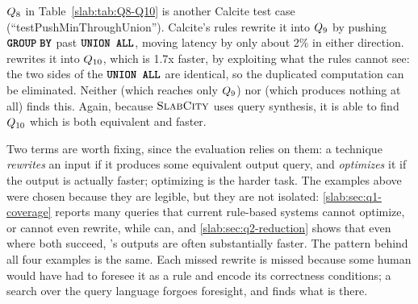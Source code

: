 $Q_8$ in Table~\ref{slab:tab:Q8-Q10} is another Calcite test
case (``testPushMinThroughUnion''). Calcite's rules rewrite it into
$Q_9$ by pushing ${\color{black}{{\textbf{\texttt{GROUP}}\;\textbf{\texttt{BY}}}}}$ past $\sqlunionallcolor$,
moving latency by only about 2\% in either direction. \slabcity
rewrites it into $Q_{10}$, which is 1.7x faster, by exploiting
what the rules cannot see: the two sides of the $\sqlunionallcolor$
are identical, so the duplicated computation can be eliminated.
Neither \learnedrewrite (which reaches only $Q_9$) nor \wetune
(which produces nothing at all) finds this.
Again, because $\textsc{SlabCity}$ uses query synthesis, it is able to find $Q_{10}$ which is both equivalent and faster.


Two terms are worth fixing, since the evaluation relies on them: a
technique \emph{rewrites} an input if it produces some equivalent
output query, and \emph{optimizes} it if the output is actually
faster; optimizing is the harder task. The examples above were chosen
because they are legible, but they are not isolated:
\cref{slab:sec:q1-coverage} reports many queries that current
rule-based systems cannot optimize, or cannot even rewrite, while
\slabcity can, and \cref{slab:sec:q2-reduction} shows that even where
both succeed, \slabcity's outputs are often substantially faster. The
pattern behind all four examples is the same. Each missed rewrite is
missed because some human would have had to foresee it as a rule and
encode its correctness conditions; a search over the query language
forgoes foresight, and finds what is there.

